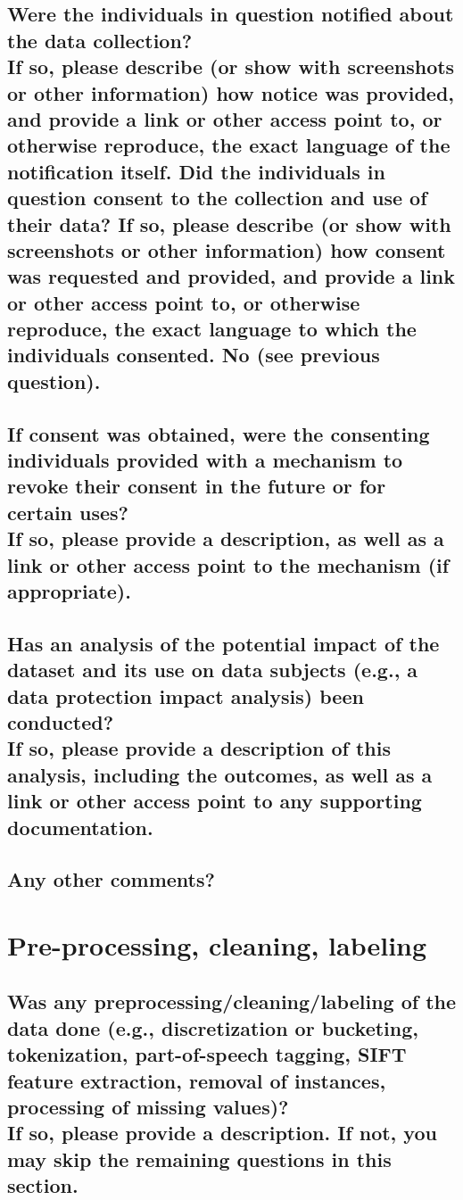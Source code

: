 \documentclass[letterpaper, 10 pt, conference]{ieeeconf}  %
\newcommand{\subtitle}[1]{{\\ \small \normalfont \color{purple} #1}}
\begin{document}
\lipsum[1]

\subsection{Were the individuals in question notified about the data collection? \subtitle{If so, please describe (or show with screenshots or other information) how notice was provided, and provide a link or other access point to, or otherwise reproduce, the exact language of the notification itself. Did the individuals in question consent to the collection and use of their data? If so, please describe (or show with screenshots or other information) how consent was requested and provided, and provide a link or other access point to, or otherwise reproduce, the exact language to which the individuals consented. No (see previous question).}}

\lipsum[1]

\subsection{If consent was obtained, were the consenting individuals provided with a mechanism to revoke their consent in the future or for certain uses? \subtitle{If so, please provide a description, as well as a link or other access point to the mechanism (if appropriate).}}
\lipsum[1]

\subsection{Has an analysis of the potential impact of the dataset and its use on data subjects (e.g., a data protection impact analysis) been conducted? \subtitle{If so, please provide a description of this analysis, including the outcomes, as well as a link or other access point to any supporting documentation.}}
\lipsum[1]

\subsection{Any other comments?}
\lipsum[1]

\section{Pre-processing, cleaning, labeling}

\subsection{Was any preprocessing/cleaning/labeling of the data done (e.g., discretization or bucketing, tokenization, part-of-speech tagging, SIFT feature extraction, removal of instances, processing of missing values)? \subtitle{If so, please provide a description. If not, you may skip the remaining questions in this section.}}
\end{document}
